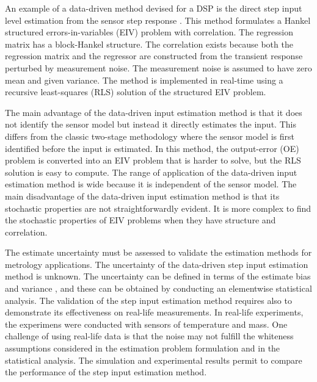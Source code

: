 An example of a data-driven method devised for a DSP is the direct step input level estimation from the sensor step response \citep{Markovsky15cep}.
This method formulates a Hankel structured errors-in-variables (EIV) problem with correlation.
The regression matrix has a block-Hankel structure.
The correlation exists because both the regression matrix and the regressor are constructed from the transient response perturbed by measurement noise.
The measurement noise is assumed to have zero mean and given variance.
The method is implemented in real-time using a recursive least-squares (RLS) solution of the structured EIV problem.

The main advantage of the data-driven input estimation method is that it does not identify the sensor model but instead it directly estimates the input. 
This differs from the classic two-stage methodology where the sensor model is first identified before the input is estimated.
In this method, the output-error (OE) problem is converted into an EIV problem that is harder to solve, but the RLS solution is easy to compute.
The range of application of the data-driven input estimation method is wide because it is independent of the sensor model.
The main disadvantage of the data-driven input estimation method is that its stochastic properties are not straightforwardly evident. 
It is more complex to find the stochastic properties of EIV problems when they have structure and correlation.


The estimate uncertainty must be assessed to validate the estimation methods for metrology applications.
The uncertainty of the data-driven step input estimation method \citep{Markovsky15ieee} is unknown.
The uncertainty can be defined in terms of the estimate bias and variance \citep{Pintelon12Book}, and these can be obtained by conducting an elementwise statistical analysis.
The validation of the step input estimation method requires also to demonstrate its effectiveness on real-life measurements.
In real-life experiments, the experimens were conducted with sensors of temperature and mass.
One challenge of using real-life data is that the noise may not fulfill the whiteness assumptions considered in the estimation problem formulation and in the statistical analysis.
The simulation and experimental results permit to compare the performance of the step input estimation method.

